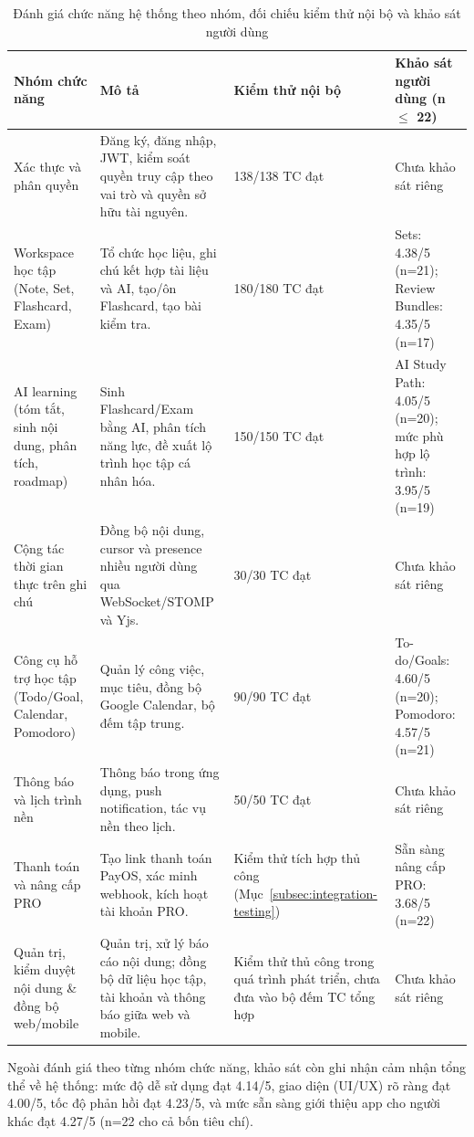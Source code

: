 \begin{table}[H]
\centering
\caption{Đánh giá chức năng hệ thống theo nhóm, đối chiếu kiểm thử nội bộ và khảo sát người dùng}
\label{tab:function-evaluation-1}
\small
\begin{tabular}{|L{0.17\textwidth}|L{0.32\textwidth}|L{0.18\textwidth}|L{0.25\textwidth}|}
\hline
\textbf{Nhóm chức năng} & \textbf{Mô tả} & \textbf{Kiểm thử nội bộ} & \textbf{Khảo sát người dùng (n $\le$ 22)} \\
\hline
Xác thực và phân quyền & Đăng ký, đăng nhập, JWT, kiểm soát quyền truy cập theo vai trò và quyền sở hữu tài nguyên. & 138/138 TC đạt & Chưa khảo sát riêng \\
\hline
Workspace học tập (Note, Set, Flashcard, Exam) & Tổ chức học liệu, ghi chú kết hợp tài liệu và AI, tạo/ôn Flashcard, tạo bài kiểm tra. & 180/180 TC đạt & Sets: 4.38/5 (n=21); Review Bundles: 4.35/5 (n=17) \\
\hline
AI learning (tóm tắt, sinh nội dung, phân tích, roadmap) & Sinh Flashcard/Exam bằng AI, phân tích năng lực, đề xuất lộ trình học tập cá nhân hóa. & 150/150 TC đạt & AI Study Path: 4.05/5 (n=20); mức phù hợp lộ trình: 3.95/5 (n=19) \\
\hline
Cộng tác thời gian thực trên ghi chú & Đồng bộ nội dung, cursor và presence nhiều người dùng qua WebSocket/STOMP và Yjs. & 30/30 TC đạt & Chưa khảo sát riêng \\
\hline
Công cụ hỗ trợ học tập (Todo/Goal, Calendar, Pomodoro) & Quản lý công việc, mục tiêu, đồng bộ Google Calendar, bộ đếm tập trung. & 90/90 TC đạt & To-do/Goals: 4.60/5 (n=20); Pomodoro: 4.57/5 (n=21) \\
\hline
Thông báo và lịch trình nền & Thông báo trong ứng dụng, push notification, tác vụ nền theo lịch. & 50/50 TC đạt & Chưa khảo sát riêng \\
\hline
Thanh toán và nâng cấp PRO & Tạo link thanh toán PayOS, xác minh webhook, kích hoạt tài khoản PRO. & Kiểm thử tích hợp thủ công (Mục~\ref{subsec:integration-testing}) & Sẵn sàng nâng cấp PRO: 3.68/5 (n=22) \\
\hline
Quản trị, kiểm duyệt nội dung \& đồng bộ web/mobile & Quản trị, xử lý báo cáo nội dung; đồng bộ dữ liệu học tập, tài khoản và thông báo giữa web và mobile. & Kiểm thử thủ công trong quá trình phát triển, chưa đưa vào bộ đếm TC tổng hợp & Chưa khảo sát riêng \\
\hline
\end{tabular}
\end{table}

Ngoài đánh giá theo từng nhóm chức năng, khảo sát còn ghi nhận cảm nhận tổng thể về hệ thống: mức độ dễ sử dụng đạt 4.14/5, giao diện (UI/UX) rõ ràng đạt 4.00/5, tốc độ phản hồi đạt 4.23/5, và mức sẵn sàng giới thiệu app cho người khác đạt 4.27/5 (n=22 cho cả bốn tiêu chí).

